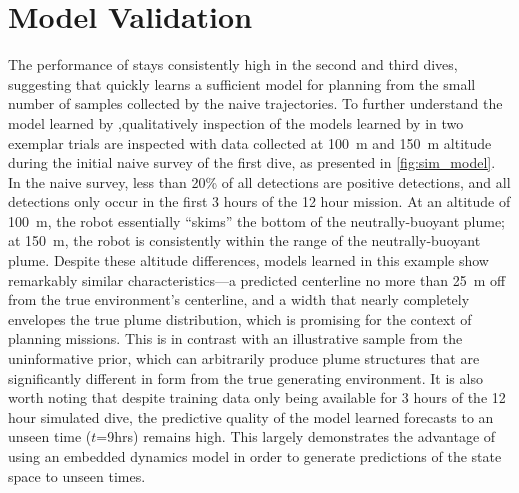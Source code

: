 \section{\PHUMES Model Validation}
\label{sec:phumes_perform}
The performance of \PHORTEX stays consistently high in the second and third dives, suggesting that \PHUMES quickly learns a sufficient model for planning from the small number of samples collected by the naive trajectories. To further understand the model learned by \PHUMES,qualitatively inspection of the models learned by \PHUMES in two exemplar trials are inspected with data collected at \SI{100}{\meter} and \SI{150}{\meter} altitude during the initial naive survey of the first dive, as presented in \cref{fig:sim_model}. In the naive survey, less than 20\% of all detections are positive detections, and all detections only occur in the first 3 hours of the 12 hour mission. At an altitude of \SI{100}{\meter}, the robot essentially ``skims'' the bottom of the neutrally-buoyant plume; at \SI{150}{\meter}, the robot is consistently within the range of the neutrally-buoyant plume. Despite these altitude differences, models learned in this example show remarkably similar characteristics---a predicted centerline no more than \SI{25}{\meter} off from the true environment's centerline, and a width that nearly completely envelopes the true plume distribution, which is promising for the context of planning missions. This is in contrast with an illustrative sample from the uninformative prior, which can arbitrarily produce plume structures that are significantly different in form from the true generating environment. It is also worth noting that despite training data only being available for 3 hours of the 12 hour simulated dive, the predictive quality of the model learned forecasts to an unseen time ($t$=9hrs) remains high. This largely demonstrates the advantage of using an embedded dynamics model in order to generate predictions of the state space to unseen times.

